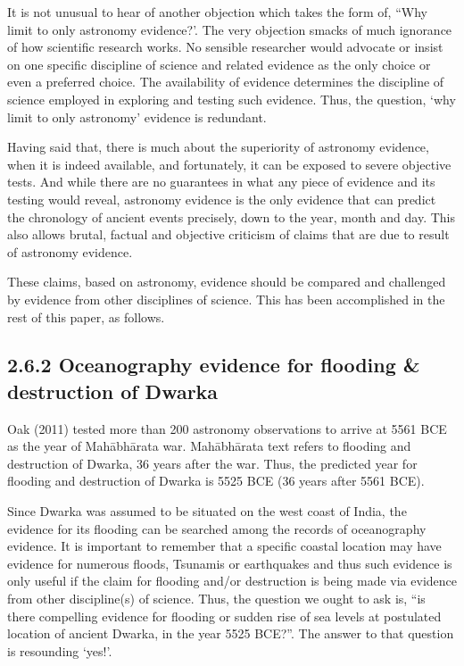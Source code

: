 It is not unusual to hear of another objection which takes the form of, “Why limit to only astronomy evidence?’. The very objection smacks of much ignorance of how scientific research works. No sensible researcher would advocate or insist on one specific discipline of science and related evidence as the only choice or even a preferred choice. The availability of evidence determines the discipline of science employed in exploring and testing such evidence. Thus, the question, ‘why limit to only astronomy’ evidence is redundant.

Having said that, there is much about the superiority of astronomy evidence, when it is indeed available, and fortunately, it can be exposed to severe objective tests. And while there are no guarantees in what any piece of evidence and its testing would reveal, astronomy evidence is the only evidence that can predict the chronology of ancient events precisely, down to the year, month and day. This also allows brutal, factual and objective criticism of claims that are due to result of astronomy evidence.

These claims, based on astronomy, evidence should be compared and challenged by evidence from other disciplines of science. This has been accomplished in the rest of this paper, as follows.


\subsection{2.6.2 Oceanography evidence for flooding \& destruction of Dwarka}

Oak (2011) tested more than 200 astronomy observations to arrive at 5561 BCE as the year of Mahābhārata war. Mahābhārata text refers to flooding and destruction of Dwarka, 36 years after the war. Thus, the predicted year for flooding and destruction of Dwarka is 5525 BCE (36 years after 5561 BCE).

Since Dwarka was assumed to be situated on the west coast of India, the evidence for its flooding can be searched among the records of oceanography evidence. It is important to remember that a specific coastal location may have evidence for numerous floods, Tsunamis or earthquakes and thus such evidence is only useful if the claim for flooding and/or destruction is being made via evidence from other discipline(s) of science. Thus, the question we ought to ask is, “is there compelling evidence for flooding or sudden rise of sea levels at postulated location of ancient Dwarka, in the year 5525 BCE?”. The answer to that question is resounding ‘yes!’.

